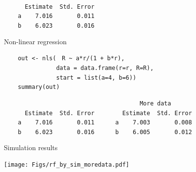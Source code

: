\documentclass[12pt]{article}
\newcommand{\headsize}{\fontsize{35}{35} \selectfont}
\newcommand{\textsize}{\fontsize{30}{35} \selectfont}
\begin{document}
{\vspace{15mm}

\color{mywhite}
\verb|                          | \\
\verb|      Estimate  Std. Error| \\
\verb|    a    7.016       0.011| \\
\verb|    b    6.023       0.016|

\newpage


\addtocounter{page}{-1}

\headsize \color{myyellow}
\hfill \begin{minipage}{5.75in}
\centering
Non-linear regression
\end{minipage}


\vspace{30mm}

\textsize
{\color{myblue}
\verb|    out <- nls(| {\tt \color{mypink} R \verb|~| a*r/(1 + b*r)}\verb|,| \\
\verb|               data = data.frame(r=r, R=R),| \\
\verb|               start = list(a=4, b=6))| \\
\verb|    summary(out)|
}

\vspace{15mm}

\color{mypink}
\verb|                                       More data      | \\
\color{mywhite}
\verb|      Estimate  Std. Error        Estimate  Std. Error| \\
\verb|    a    7.016       0.011      a    7.003       0.008| \\
\verb|    b    6.023       0.016      b    6.005       0.012|


\newpage


\headsize \color{myyellow}
\hfill \begin{minipage}{5.75in}
\centering
Simulation results
\end{minipage}

\vfill

\centerline{\texttt{[image: Figs/rf\_by\_sim\_moredata.pdf]}}

\vspace{15mm}

\newpage


}
\end{document}
